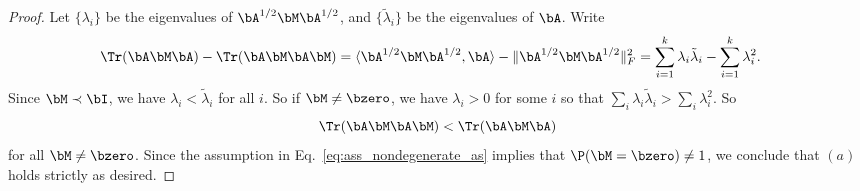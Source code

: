 \begin{proof}
Let $\{\lambda_i\}$ be the eigenvalues of $\bA^{1/2}\bM\bA^{1/2}$, and $\{\tilde\lambda_i\}$ be the eigenvalues of $\bA$. 
Write
\begin{align}
 \Tr(\bA \bM\bA)- \Tr(\bA \bM \bA \bM)
 &= \langle \bA^{1/2}\bM \bA^{1/2}, \bA\rangle -\| \bA^{1/2}\bM \bA^{1/2}\|_F^2 
=  \sum_{i=1}^k \lambda_i \tilde\lambda_i -\sum_{i=1}^k \lambda_i^2.
\end{align}
Since $\bM \prec \bI$, we have $\lambda_i < \tilde\lambda_i$ for all $i$. So if $\bM \neq \bzero$, we have $\lambda_i >0$ for some $i$ so that
    $\sum_{i} \lambda_i \tilde\lambda_i > \sum_i \lambda_i^2.$
So
\begin{equation}
  \Tr(\bA \bM \bA \bM) < \Tr(\bA \bM\bA)
\end{equation}
for all $\bM \neq \bzero$. Since the assumption
in Eq.~\eqref{eq:ass_nondegenerate_as} 
implies that $\P(\bM = \bzero) \neq 1$,  we conclude that $(a)$ holds strictly as desired.
\end{proof}

